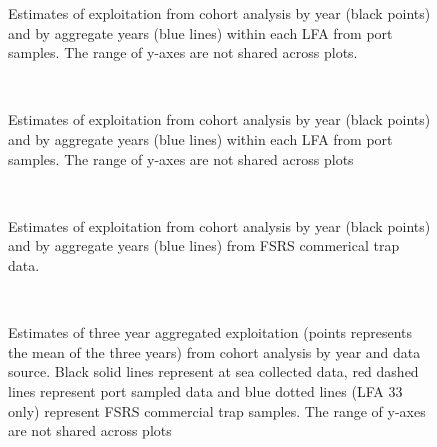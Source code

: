 \documentclass[11pt]{article}
\newcommand{\e}{/backup/bio_data/bio.lobster/figures/} %
\begin{document}
\begin{landscape}
\begin{figure}
                    \caption{Estimates of exploitation from cohort analysis by year (black points) and by aggregate years (blue lines) within each LFA from port samples. The range of y-axes are not shared across plots.}
        \end{figure}

\begin{figure}
        \centering
         \\
                     \caption{Estimates of exploitation from cohort analysis by year (black points) and by aggregate years (blue lines) within each LFA from port samples. The range of y-axes are not shared across plots}
        \end{figure}

\begin{figure}
        \centering
         \\
                     \caption{Estimates of exploitation from cohort analysis by year (black points) and by aggregate years (blue lines) from FSRS commerical trap data.}
        \end{figure}


\begin{figure}
        \centering
         \\
                    
                    \caption{Estimates of three year aggregated exploitation (points represents the mean of the three years) from cohort analysis by year and data source. Black solid lines represent at sea collected data, red dashed lines represent port sampled data and blue dotted lines (LFA 33 only) represent FSRS commercial trap samples. The range of y-axes are not shared across plots}
        \end{figure}



\end{landscape}
\end{document}
